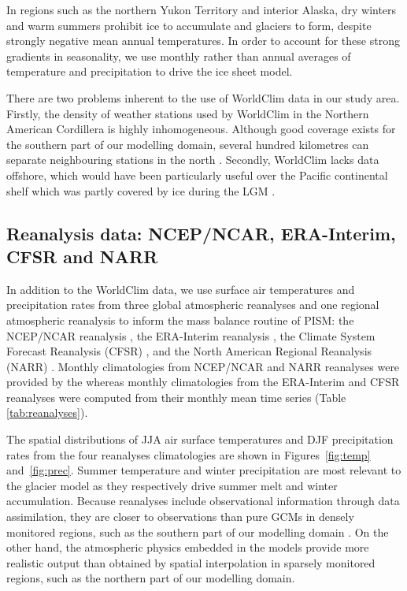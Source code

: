 In regions such as the northern Yukon Territory and interior Alaska, dry winters and warm summers prohibit ice to accumulate and glaciers to form, despite strongly negative mean annual temperatures. In order to account for these strong gradients in seasonality, we use monthly rather than annual averages of temperature and precipitation to drive the ice sheet model.

There are two problems inherent to the use of WorldClim data in our study area. Firstly, the density of weather stations used by WorldClim in the Northern American Cordillera is highly inhomogeneous. Although good coverage exists for the southern part of our modelling domain, several hundred kilometres can separate neighbouring stations in the north \citep{data:worldclim}. Secondly, WorldClim lacks data offshore, which would have been particularly useful over the Pacific continental shelf which was partly covered by ice during the LGM \citep{jackson-clague-1991}.


\subsection{Reanalysis data: NCEP/NCAR, ERA-Interim, CFSR and NARR}

In addition to the WorldClim data, we use surface air temperatures and precipitation rates from three global atmospheric reanalyses and one regional atmospheric reanalysis to inform the mass balance routine of PISM: the NCEP/NCAR reanalysis \citep{data:ncar}, the ERA-Interim reanalysis \citep{data:erai}, the Climate System Forecast Reanalysis (CFSR) \citep{data:cfsr}, and the North American Regional Reanalysis (NARR) \citep{data:narr}. Monthly climatologies from NCEP/NCAR and NARR reanalyses were provided by the \citet{web:psd} whereas monthly climatologies from the ERA-Interim and CFSR reanalyses were computed from their monthly mean time series (Table \ref{tab:reanalyses}).

The spatial distributions of JJA air surface temperatures and DJF precipitation rates from the four reanalyses climatologies are shown in Figures~\ref{fig:temp} and~\ref{fig:prec}. Summer temperature and winter precipitation are most relevant to the glacier model as they respectively drive summer melt and winter accumulation. Because reanalyses include observational information through data assimilation, they are closer to observations than pure GCMs in densely monitored regions, such as the southern part of our modelling domain \citep{bengtsson-etal-2007}. On the other hand, the atmospheric physics embedded in the models provide more realistic output than obtained by spatial interpolation in sparsely monitored regions, such as the northern part of our modelling domain.

